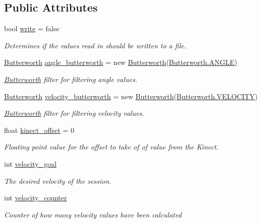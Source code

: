 \subsection*{Public Attributes}
\begin{DoxyCompactItemize}
\item 
bool \hyperlink{classkinect_expirement_1_1_kinect_form_a2faba08ba3886e70886d6289dcc09896}{write} = false
\begin{DoxyCompactList}\small\item\em Determines if the values read in should be written to a file. \end{DoxyCompactList}\item 
\hyperlink{classkinect_expirement_1_1_butterworth}{Butterworth} \hyperlink{classkinect_expirement_1_1_kinect_form_abec90e6db4a70d6cccc38f90f800e3ab}{angle\+\_\+butterworth} = new \hyperlink{classkinect_expirement_1_1_butterworth}{Butterworth}(\hyperlink{classkinect_expirement_1_1_butterworth_ac991123445c654cb0da7d7841e313b2c}{Butterworth.\+A\+N\+G\+LE})
\begin{DoxyCompactList}\small\item\em \hyperlink{classkinect_expirement_1_1_butterworth}{Butterworth} filter for filtering angle values. \end{DoxyCompactList}\item 
\hyperlink{classkinect_expirement_1_1_butterworth}{Butterworth} \hyperlink{classkinect_expirement_1_1_kinect_form_a7f1502bd90febb3137d8e4fdf71d52ec}{velocity\+\_\+butterworth} = new \hyperlink{classkinect_expirement_1_1_butterworth}{Butterworth}(\hyperlink{classkinect_expirement_1_1_butterworth_afc717929ffc8d554b7e0263e2b06806a}{Butterworth.\+V\+E\+L\+O\+C\+I\+TY})
\begin{DoxyCompactList}\small\item\em \hyperlink{classkinect_expirement_1_1_butterworth}{Butterworth} filter for filtering velocity values. \end{DoxyCompactList}\item 
float \hyperlink{classkinect_expirement_1_1_kinect_form_a97a0dd9256e1093328fafccaca672398}{kinect\+\_\+offset} = 0
\begin{DoxyCompactList}\small\item\em Floating point value for the offset to take of of value from the Kinect. \end{DoxyCompactList}\item 
int \hyperlink{classkinect_expirement_1_1_kinect_form_a6334825924ef2914544c0c96c0ad0572}{velocity\+\_\+goal}
\begin{DoxyCompactList}\small\item\em The desired velocity of the session. \end{DoxyCompactList}\item 
int \hyperlink{classkinect_expirement_1_1_kinect_form_aedd93118198e798ee966ff768038bac1}{velocity\+\_\+counter}
\begin{DoxyCompactList}\small\item\em Counter of how many velocity values have been calculated \end{DoxyCompactList}\end{DoxyCompactItemize}
